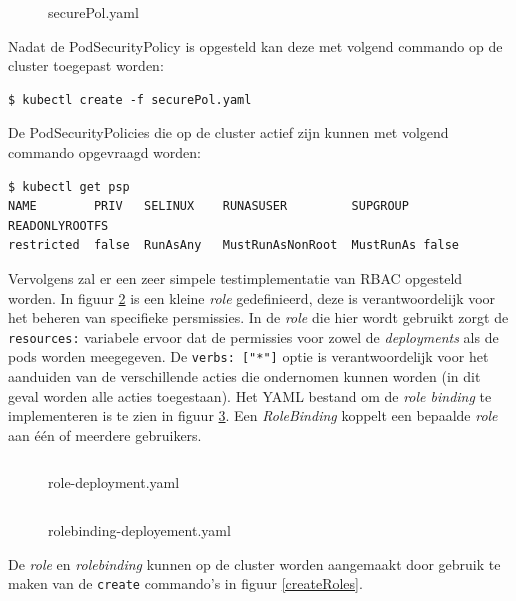 \begin{figure}[h] 
	\centering
	\inputminted[fontsize=\footnotesize,linenos]{yaml}{files/securePol.yaml}
	\caption{securePol.yaml}
	\label{securePol}
\end{figure}

Nadat de PodSecurityPolicy is opgesteld kan deze met volgend commando op de cluster toegepast worden:
\begin{verbatim} 
$ kubectl create -f securePol.yaml
\end{verbatim}

De PodSecurityPolicies die op de cluster actief zijn kunnen met volgend commando opgevraagd worden:

\begin{verbatim} 
$ kubectl get psp
NAME        PRIV   SELINUX    RUNASUSER         SUPGROUP  READONLYROOTFS   
restricted  false  RunAsAny   MustRunAsNonRoot  MustRunAs false          
\end{verbatim}


Vervolgens zal er een zeer simpele testimplementatie van RBAC opgesteld worden. In figuur \ref{roleDeploy} is een kleine \textit{role} gedefinieerd, deze is verantwoordelijk voor het beheren van specifieke persmissies. In de \textit{role} die hier wordt gebruikt zorgt de \verb|resources:| variabele ervoor dat de permissies voor zowel de \textit{deployments} als de pods worden meegegeven. De \verb|verbs: ["*"]| optie is verantwoordelijk voor het aanduiden van de verschillende acties die ondernomen kunnen worden (in dit geval worden alle acties toegestaan). Het YAML bestand om de \textit{role binding} te implementeren is te zien in figuur \ref{roleBindDeploy}. Een \textit{RoleBinding} koppelt een bepaalde \textit{role} aan één of meerdere gebruikers. 
\begin{figure}[h] 
	\centering
	\inputminted[fontsize=\footnotesize,linenos]{yaml}{files/role-deployment.yaml}
	\caption{role-deployment.yaml}
	\label{roleDeploy}
\end{figure}

\begin{figure}[h] 
	\centering
	\inputminted[fontsize=\footnotesize,linenos]{yaml}{files/rolebinding-deployment.yaml}
	\caption{rolebinding-deployement.yaml}
	\label{roleBindDeploy}
\end{figure}

De \textit{role} en \textit{rolebinding} kunnen op de cluster worden aangemaakt door gebruik te maken van de \verb|create| commando's in figuur \ref{createRoles}.

